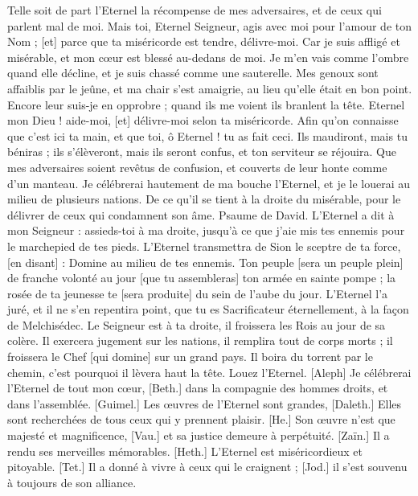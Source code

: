 \begin{multicols}{2}
Telle soit de part l'Eternel la récompense de mes adversaires, et de ceux qui parlent mal de moi.
Mais toi, Eternel Seigneur, agis avec moi pour l'amour de ton Nom ; [et] parce que ta miséricorde est tendre, délivre-moi.
Car je suis affligé et misérable, et mon cœur est blessé au-dedans de moi.
Je m'en vais comme l'ombre quand elle décline, et je suis chassé comme une sauterelle.
Mes genoux sont affaiblis par le jeûne, et ma chair s'est amaigrie, au lieu qu'elle était en bon point.
Encore leur suis-je en opprobre ; quand ils me voient ils branlent la tête.
Eternel mon Dieu ! aide-moi, [et] délivre-moi selon ta miséricorde.
Afin qu'on connaisse que c'est ici ta main, et que toi, ô Eternel ! tu as fait ceci.
Ils maudiront, mais tu béniras ; ils s'élèveront, mais ils seront confus, et ton serviteur se réjouira.
Que mes adversaires soient revêtus de confusion, et couverts de leur honte comme d'un manteau.
Je célébrerai hautement de ma bouche l'Eternel, et je le louerai au milieu de plusieurs nations.
De ce qu'il se tient à la droite du misérable, pour le délivrer de ceux qui condamnent son âme.
\VerseOne{}Psaume de David. L'Eternel a dit à mon Seigneur : assieds-toi à ma droite, jusqu’à ce que j'aie mis tes ennemis pour le marchepied de tes pieds.
L'Eternel transmettra de Sion le sceptre de ta force, [en disant] : Domine au milieu de tes ennemis.
Ton peuple [sera un peuple plein] de franche volonté au jour [que tu assembleras] ton armée en sainte pompe ; la rosée de ta jeunesse te [sera produite] du sein de l'aube du jour.
L'Eternel l'a juré, et il ne s'en repentira point, que tu es Sacrificateur éternellement, à la façon de Melchisédec.
Le Seigneur est à ta droite, il froissera les Rois au jour de sa colère.
Il exercera jugement sur les nations, il remplira tout de corps morts ; il froissera le Chef [qui domine] sur un grand pays.
Il boira du torrent par le chemin, c'est pourquoi il lèvera haut la tête.
\VerseOne{}Louez l'Eternel. [Aleph] Je célébrerai l'Eternel de tout mon cœur, [Beth.] dans la compagnie des hommes droits, et dans l'assemblée.
[Guimel.] Les œuvres de l'Eternel sont grandes, [Daleth.] Elles sont recherchées de tous ceux qui y prennent plaisir.
[He.] Son œuvre n'est que majesté et magnificence, [Vau.] et sa justice demeure à perpétuité.
[Zaïn.] Il a rendu ses merveilles mémorables. [Heth.] L'Eternel est miséricordieux et pitoyable.
[Tet.] Il a donné à vivre à ceux qui le craignent ; [Jod.] il s'est souvenu à toujours de son alliance.

\end{multicols}
